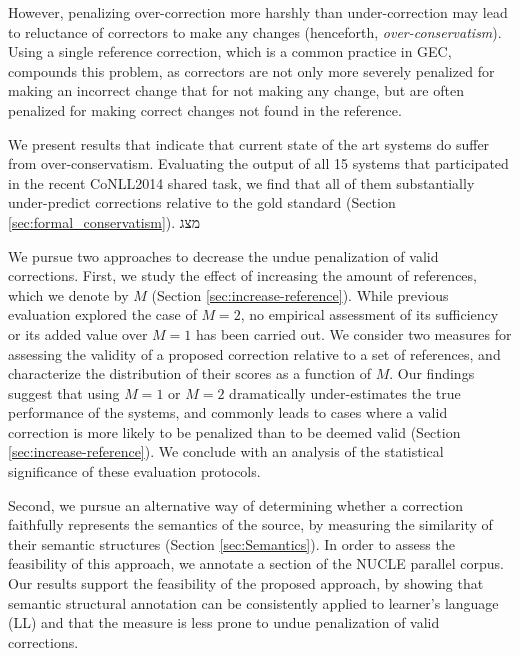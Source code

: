 \documentclass[letter,11pt]{article}
\begin{document}
However, penalizing over-correction more harshly than under-correction
may lead to reluctance of correctors to
make any changes (henceforth, {\it over-conservatism}).
Using a single reference correction, which is a common practice in GEC, compounds this problem,
as correctors are not only more severely penalized for making an incorrect change that for not making
any change, but are often penalized for making correct changes not found in the reference.

We present results that indicate that current state of the art systems do suffer
from over-conservatism. Evaluating the output of all 15 systems that participated
in the recent CoNLL2014 shared task, we find that all of them
substantially under-predict corrections relative to the gold standard
(Section \ref{sec:formal_conservatism}). מצג

We pursue two approaches to decrease the undue penalization of valid corrections.
First, we study the effect of increasing the amount of references,
which we denote by $M$ (Section \ref{sec:increase-reference}).
While previous evaluation explored the case of $M=2$,
no empirical assessment of its sufficiency or its added value over $M=1$
has been carried out.
We consider two measures for
assessing the validity of a proposed correction relative to a set of references,
and characterize the distribution of their scores as a function of $M$.
Our findings suggest that using $M=1$ or $M=2$ dramatically under-estimates
the true performance of the systems, and commonly leads to cases where a valid
correction is more likely to be penalized than to be deemed valid
(Section \ref{sec:increase-reference}). 
We conclude with an analysis of
the statistical significance of these evaluation protocols.

Second, we pursue an alternative way of determining whether a correction faithfully
represents the semantics of the source, by measuring the
similarity of their semantic structures (Section \ref{sec:Semantics}).
In order to assess the feasibility of this approach, we annotate a
section of the NUCLE \cite{dahlmeier2013building}
parallel corpus. Our results support the feasibility of the proposed approach,
by showing that semantic structural annotation can be consistently applied
to learner's language (LL) and that the measure is less prone to undue penalization of
valid corrections.
\end{document}
